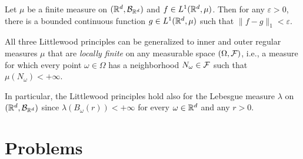 \begin{theorem}[Approximation in $L^1$]\label{thm:L1-approximation}
	Let $\mu$ be a finite measure on $(\mathbb R^d,\mathcal B_{\mathbb R^d})$ and $f\in L^1(\mathbb R^d,\mu)$. Then for any $\varepsilon>0$, there is a bounded continuous function $g\in L^1(\mathbb R^d,\mu)$ such that $\|f-g\|_1<\varepsilon$.
\end{theorem}

\begin{remark}
	All three Littlewood principles can be generalized to inner and outer regular measures $\mu$ that are \emph{locally finite} on any measurable space $(\Omega,\mathcal F)$, i.e., a measure for which every point $\omega\in\Omega$ has a neighborhood $N_\omega\in\mathcal F$ such that $\mu(N_\omega)<+\infty$. 
	
	In particular, the Littlewood principles hold also for the Lebesgue measure $\lambda$ on $(\mathbb R^d,\mathcal B_{\mathbb R^d})$ since $\lambda(B_\omega(r))<+\infty$ for every $\omega\in\mathbb R^d$ and any $r>0$.
\end{remark}

\section{Problems}


